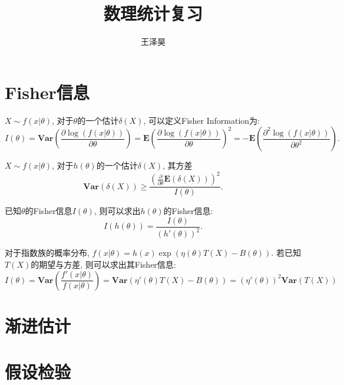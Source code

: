 \documentclass[cn, 14pt, black, mode=geye, screen]{elegantnote}
\author{王泽昊}
\title{数理统计复习}
\date{\zhtoday}
\newcommand{\Var}[1]{\textbf{Var}\left(#1\right)}
\newcommand{\E}[1]{\textbf{E}\left(#1\right)}
\newcommand{\Pder}[2]{\frac{\partial #1}{\partial #2}}
\begin{document}
    \maketitle
    \tableofcontents

    \newpage
    \section{Fisher信息}
    \begin{definition}
        $X\sim f(x|\theta)$, 对于$\theta$的一个估计$\delta(X)$, 可以定义Fisher Information为: 
        \begin{equation}
            I(\theta)=\Var{\Pder{\log(f(x|\theta))}{\theta}}=\E{\Pder{\log(f(x|\theta))}{\theta}}^2=-\E{\frac{\partial^2\log(f(x|\theta))}{\partial\theta^2}}. 
        \end{equation}
    \end{definition}

    \begin{theorem}
        $X\sim f(x|\theta)$, 对于$h(\theta)$的一个估计$\delta(X)$, 其方差
        \begin{equation}
            \Var{\delta(X)}\geq \frac{\left(\Pder{}{\theta}\E{\delta(X)}\right)^2}{I(\theta)}. 
        \end{equation}
    \end{theorem}

    \begin{example}
        已知$\theta$的Fisher信息$I(\theta)$, 则可以求出$h(\theta)$的Fisher信息: 
        \begin{equation}
            I(h(\theta))=\frac{I(\theta)}{(h'(\theta))^2}. 
        \end{equation}
    \end{example}

    对于指数族的概率分布, $f(x|\theta)=h(x)\exp\left(\eta(\theta)T(X)-B(\theta)\right)$. 若已知$T(X)$的期望与方差, 则可以求出其Fisher信息:
    \begin{equation}
        I(\theta)=\Var{\frac{f'(x|\theta)}{f(x|\theta)}}=\Var{\eta'(\theta)T(X)-B(\theta)}=(\eta'(\theta))^2\Var{T(X)}
    \end{equation}

    
    
    \section{渐进估计}

    \section{假设检验}
\end{document}

